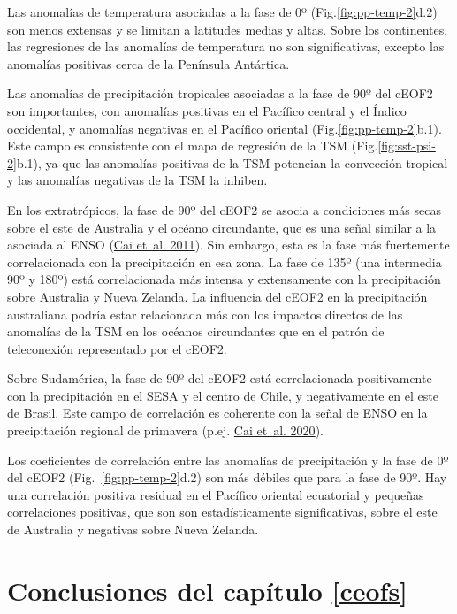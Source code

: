 \documentclass[12pt,oneside,a4paper]{reedthesis}
\begin{document}
Las anomalías de temperatura asociadas a la fase de 0º (Fig.\ref{fig:pp-temp-2}d.2) son menos extensas y se limitan a latitudes medias y altas.
Sobre los continentes, las regresiones de las anomalías de temperatura no son significativas, excepto las anomalías positivas cerca de la Península Antártica.

Las anomalías de precipitación tropicales asociadas a la fase de 90º del cEOF2 son importantes, con anomalías positivas en el Pacífico central y el Índico occidental, y anomalías negativas en el Pacífico oriental (Fig.\ref{fig:pp-temp-2}b.1).
Este campo es consistente con el mapa de regresión de la TSM (Fig.\ref{fig:sst-psi-2}b.1), ya que las anomalías positivas de la TSM potencian la convección tropical y las anomalías negativas de la TSM la inhiben.

En los extratrópicos, la fase de 90º del cEOF2 se asocia a condiciones más secas sobre el este de Australia y el océano circundante, que es una señal similar a la asociada al ENSO (\protect\hyperlink{ref-cai2011}{Cai et~al. 2011}).
Sin embargo, esta es la fase más fuertemente correlacionada con la precipitación en esa zona.
La fase de 135º (una intermedia 90º y 180º) está correlacionada más intensa y extensamente con la precipitación sobre Australia y Nueva Zelanda.
La influencia del cEOF2 en la precipitación australiana podría estar relacionada más con los impactos directos de las anomalías de la TSM en los océanos circundantes que en el patrón de teleconexión representado por el cEOF2.

Sobre Sudamérica, la fase de 90º del cEOF2 está correlacionada positivamente con la precipitación en el SESA y el centro de Chile, y negativamente en el este de Brasil.
Este campo de correlación es coherente con la señal de ENSO en la precipitación regional de primavera (p.ej. \protect\hyperlink{ref-cai2020a}{Cai et~al. 2020}).

Los coeficientes de correlación entre las anomalías de precipitación y la fase de 0º del cEOF2 (Fig.~\ref{fig:pp-temp-2}d.2) son más débiles que para la fase de 90º.
Hay una correlación positiva residual en el Pacífico oriental ecuatorial y pequeñas correlaciones positivas, que son son estadísticamente significativas, sobre el este de Australia y negativas sobre Nueva Zelanda.

\hypertarget{conclusiones-del-capuxedtulo-refceofs}{%
\section{Conclusiones del capítulo \ref{ceofs}}\label{conclusiones-del-capuxedtulo-refceofs}}
\end{document}
